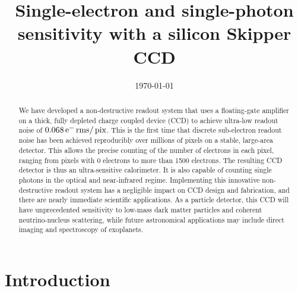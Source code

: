 \documentclass[aps,prl,reprint,superscriptaddress,floatfix,nofootinbib,showkeys,showpacs,preprintnumbers]{revtex4-1}
\begin{document}
\title{
Single-electron and single-photon sensitivity with a silicon Skipper CCD}




\date{\today}
\begin{abstract}

We have developed a non-destructive readout system that uses a floating-gate amplifier on a thick, fully depleted charge coupled device (CCD) to achieve ultra-low readout noise of $0.068 \mathrm{\,e^{-}} \mathrm{\,rms}/\mathrm{\,pix}$.
This is the first time that discrete sub-electron readout noise has been achieved reproducibly over millions of pixels on a stable, large-area detector.
This allows the precise counting of the number of electrons in each pixel, ranging from pixels with 0 electrons to more than 1500 electrons. 
The resulting CCD detector is thus an ultra-sensitive calorimeter. 
It is also capable of counting single photons in the optical and near-infrared regime.
Implementing this innovative non-destructive readout system has a negligible impact on CCD design and fabrication, and there are nearly immediate scientific applications.  
As a particle detector, this CCD will have unprecedented sensitivity to low-mass dark matter particles and coherent neutrino-nucleus scattering, while future astronomical applications may include direct imaging and spectroscopy of exoplanets.
\end{abstract}

\maketitle

\section*{Introduction}
\end{document}
